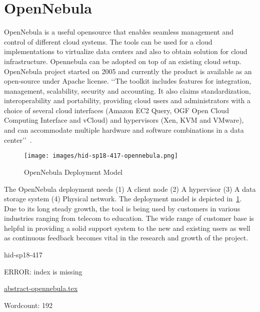 \section{OpenNebula}
OpenNebula is a useful opensource that enables seamless management and
control of different cloud systems.  The tools can be used for a cloud
implementations to virtualize data centers and also to obtain solution
for cloud infrastructure.  Opennebula can be adopted on top of an
existing cloud setup.  OpenNebula project started on 2005 and
currently the product is available as an open-source under Apache
license.
‘‘The toolkit includes features for integration, management,
scalability, security and accounting.  It also claims standardization,
interoperability and portability, providing cloud users and
administrators with a choice of several cloud interfaces (Amazon EC2
Query, OGF Open Cloud Computing Interface and vCloud) and hypervisors
(Xen, KVM and VMware), and can accommodate multiple hardware and
software combinations in a data center’’~\cite{hid-sp18-417-opennebula-wiki}.
\begin{figure}[htb]
\texttt{[image: images/hid-sp18-417-opennebula.png]}
\caption{OpenNebula Deployment Model~\cite{hid-sp18-417-opennebula-deployment}} 
\label{F:opennebula}
\end{figure}
The OpenNebula deployment needs 
(1) A client node 
(2) A hypervisor 
(3) A data storage system 
(4) Physical network. 
The deployment model is depicted in~\ref{F:opennebula}.
Due to its long steady growth, the tool is being used by customers in
various industries ranging from telecom to education.  The wide range
of customer base is helpful in providing a solid support system to the
new and existing users as well as continuous feedback becomes vital in
the research and growth of the project.


\begin{IU}

hid-sp18-417

ERROR: index is missing

\href{https://github.com/cloudmesh-community/hid-sp18-417/blob/master//technology/abstract-opennebula.tex}{abstract-opennebula.tex}

 

Wordcount: 192

\end{IU}

